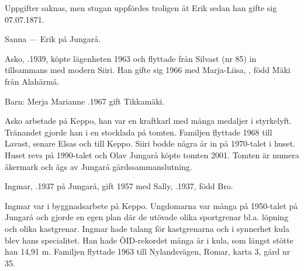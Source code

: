 Uppgifter saknas, men stugan uppfördes troligen åt Erik sedan han gifte sig 07.07.1871.

Sanna   ---  Erik  på Jungarå.



%



%
Asko, .1939, köpte lägenheten 1963 och flyttade från Silvast (nr 85) in tillsammans med modern Siiri. Han gifte sig 1966 med Marja-Liisa, , född Mäki från Alahärmä.

Barn: Merja Marianne .1967 gift Tikkamäki.

Asko arbetade på Keppo, han var en kraftkarl med många medaljer i styrkelyft. Tränandet gjorde han i en stocklada på tomten. Familjen flyttade 1968 till Lavast, senare Elsas och till Keppo. Siiri bodde några år in på 1970-talet i huset. Huset revs på 1990-talet och Olav Jungarå köpte tomten 2001. Tomten är numera åkermark och ägs av Jungarå gårdssammanslutning.


%
Ingmar, .1937 på Jungarå, gift 1957 med Sally, .1937, född Bro.
\begin{jhchildren}
  \item {}
  \item {}
  \item {}
  \item {}
  \item {}
\end{jhchildren}
Ingmar var i byggnadsarbete på Keppo. Ungdomarna var många på 1950-talet på Jungarå och gjorde en egen plan där de utövade olika sportgrenar bl.a. löpning och olika kastgrenar. Ingmar hade talang för kastgrenarna och i synnerhet kula blev hans specialitet. Han hade ÖID-rekordet många år i kula, som längst stötte han 14,91 m. Familjen flyttade 1963 till Nylandsvägen, Romar, karta 3, gård nr 35.


